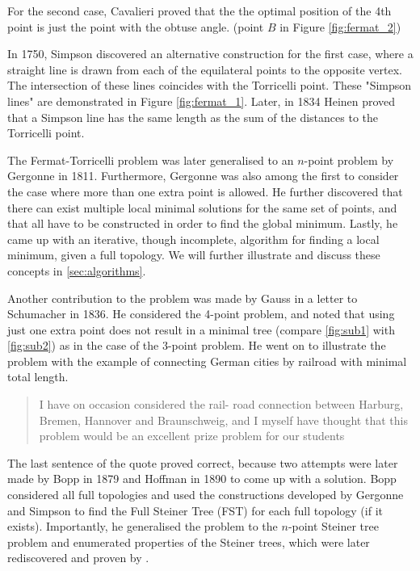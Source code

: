 \documentclass{l4proj}
\begin{document}
For the second case, Cavalieri proved that the the optimal position of the 4th point is just the point with the obtuse angle. (point $B$ in Figure \ref{fig:fermat_2})

In 1750, Simpson discovered an alternative construction for the first case, where a straight line is drawn from each of the equilateral points to the opposite vertex. The intersection of these lines coincides with the Torricelli point. These "Simpson lines" are demonstrated in Figure \ref{fig:fermat_1}.
Later, in 1834 Heinen proved that a Simpson line has the same length as the sum of the distances to the Torricelli point.

\label{sec:gergonne}
The Fermat-Torricelli problem was later generalised to an $n$-point problem by Gergonne in 1811. Furthermore, Gergonne was also among the first to consider the case where more than one extra point is allowed. He further discovered that there can exist multiple local minimal solutions for the same set of points, and that all have to be constructed in order to find the global minimum. Lastly, he came up with an iterative, though incomplete, algorithm for finding a local minimum, given a full topology. We will further illustrate and discuss these concepts in \ref{sec:algorithms}.

Another contribution to the problem was made by Gauss in a letter to Schumacher in 1836. He considered the 4-point problem, and noted that using just one extra point does not result in a minimal tree (compare \ref{fig:sub1} with \ref{fig:sub2}) as in the case of the 3-point problem. He went on to illustrate the problem with the example of connecting German cities by railroad with minimal total length.
\begin{quote}
    I have on occasion considered the rail- road connection between Harburg, Bremen, Hannover and Braunschweig, and I myself have thought that this problem would be an excellent prize problem for our students
\end{quote}

The last sentence of the quote proved correct, because two attempts were later made by Bopp in 1879 and Hoffman in 1890 to come up with a solution. Bopp considered all full topologies and used the constructions developed by Gergonne and Simpson to find the Full Steiner Tree (FST) for each full topology (if it exists). Importantly, he generalised the problem to the $n$-point Steiner tree problem and enumerated properties of the Steiner trees, which were later rediscovered and proven by \cite{Gilbert1968SteinerMT}.
\end{document}
